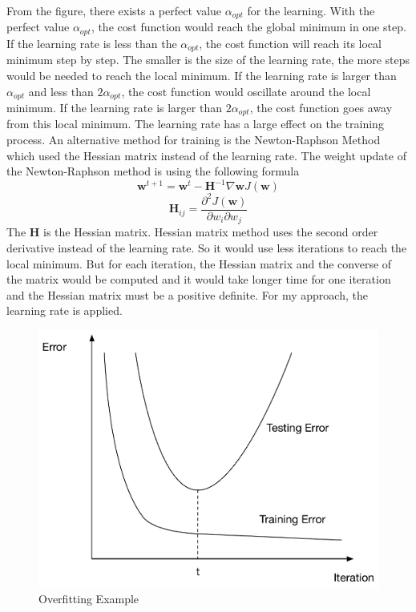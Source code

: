 From the figure, there exists a perfect value $\alpha_{opt}$ for the learning. With the perfect value $\alpha_{opt}$, the cost function would reach the global minimum in one step. If 
 the learning rate is less than the $\alpha_{opt}$, the cost function will reach its local minimum step by step. The smaller is the size of the learning rate, the more steps would be needed to reach the local minimum. If the learning rate is larger than $\alpha_{opt}$ and less than $2\alpha_{opt}$, the cost function would oscillate around the local minimum. If the learning rate is larger than $2\alpha_{opt}$, the cost function goes away from this local minimum. The learning rate has a large effect on the training process. An alternative method for  training is the Newton-Raphson Method which used the Hessian matrix instead of the learning rate.
The weight update of the Newton-Raphson method is using the following formula
\begin{equation}
{\textbf{w}}^{t+1}={\textbf{w}}^{t}-{\textbf{H}}^{-1} \nabla {\textbf{w}} J(\textbf{w})
\end{equation}
\begin{equation}
\textbf{H}_{ij} = \frac{\partial^2 J(\textbf{w})}{\partial w_i \partial w_j} 
\end{equation}
The $\textbf{H}$ is the Hessian matrix. Hessian matrix method uses the second order derivative instead of the learning rate. So it would use less iterations to reach the local minimum. But for each iteration, the Hessian matrix and the converse of the matrix would be computed and it would take longer time for one iteration and the Hessian matrix must be a positive definite. For my approach, the learning rate is applied. 
\begin{figure}
\centering
\includegraphics[scale=0.6]{overfittingExample.pdf}
\caption{Overfitting Example}
\end{figure} 
